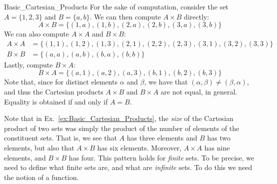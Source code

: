             \begin{lexample}{}{Basic_Cartesian_Products}
                For the sake of computation, consider the set $A=\{1,2,3\}$ and
                $B=\{a,b\}$. We can then compute $A\times{B}$ directly:
                \begin{equation}
                    A\times{B}=\big\{(1,a),(1,b),(2,a),(2,b),(3,a),(3,b)\big\}
                \end{equation}
                We can also compute $A\times{A}$ and $B\times{B}$:
                \begin{subequations}
                    \begin{align}
                        A\times{A}&=\big\{(1,1),(1,2),(1,3),
                                          (2,1),(2,2),(2,3),
                                          (3,1),(3,2),(3,3)\big\}\\
                        B\times{B}&=\big\{(a,a),(a,b),(b,a),(b,b)\big\}
                    \end{align}
                \end{subequations}
                Lastly, compute $B\times{A}$:
                \begin{equation}
                    B\times{A}=\big\{
                        (a,1),(a,2),(a,3),
                        (b,1),(b,2),(b,3)\big\}
                \end{equation}
                Note that, since for distinct elements $\alpha$
                and $\beta$, we have that
                $(\alpha,\beta)\ne(\beta,\alpha)$, and thus
                the Cartesian products $A\times{B}$ and $B\times{A}$
                are not equal, in general. Equality is obtained
                if and only if $A=B$.
            \end{lexample}
            Note that in
            Ex.~\ref{ex:Basic_Cartesian_Products}, the
            \textit{size} of the Cartesian product of two sets
            was simply the product of the number of elements of
            the constituent sets. That is, we see that $A$ has
            three elements and $B$ has two elements, but also that
            $A\times{B}$ has six elements. Moreover, $A\times{A}$
            has nine elements, and $B\times{B}$ has four. This
            pattern holds for \textit{finite} sets. To be precise,
            we need to define what finite sets are, and what
            are \textit{infinite} sets. To do this we need the
            notion of a function.
